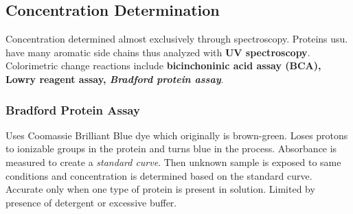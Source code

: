 \documentclass[../Bio_chemistryReview.tex]{subfiles}
\begin{document}
	\subsection{Concentration Determination\supdag}
	
	Concentration determined almost exclusively through spectroscopy. Proteins usu. have many aromatic side chains thus analyzed with \textbf{UV spectroscopy}. Colorimetric change reactions include \textbf{bicinchoninic acid assay (BCA), Lowry reagent assay, \emph{Bradford protein assay}}.
	
	\subsubsection{Bradford Protein Assay\supdag}
	
	Uses Coomassie Brilliant Blue dye which originally is brown-green. Loses protons to ionizable groups in the protein and turns blue in the process. Absorbance is measured to create a \emph{standard curve}. Then unknown sample is exposed to same conditions and concentration is determined based on the standard curve. Accurate only when one type of protein is present in solution. Limited by presence of detergent or excessive buffer.
\end{document}
